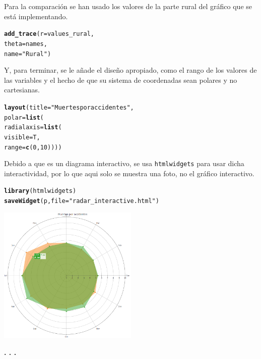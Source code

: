 \documentclass{article}\usepackage[]{graphicx}\usepackage[]{color}
\makeatletter
\newcommand{\hlnum}[1]{\textcolor[rgb]{0.686,0.059,0.569}{#1}}%
\newcommand{\hlstr}[1]{\textcolor[rgb]{0.192,0.494,0.8}{#1}}%
\newcommand{\hlstd}[1]{\textcolor[rgb]{0.345,0.345,0.345}{#1}}%
\newcommand{\hlkwc}[1]{\textcolor[rgb]{0.333,0.667,0.333}{#1}}%
\newcommand{\hlkwd}[1]{\textcolor[rgb]{0.737,0.353,0.396}{\textbf{#1}}}%
\newenvironment{kframe}{%
 \def\at@end@of@kframe{}%
 \ifinner\ifhmode%
  \def\at@end@of@kframe{\end{minipage}}%
  \begin{minipage}{\columnwidth}%
 \fi\fi%
 \def\FrameCommand##1{\hskip\@totalleftmargin \hskip-\fboxsep
 \colorbox{shadecolor}{##1}\hskip-\fboxsep
     \hskip-\linewidth \hskip-\@totalleftmargin \hskip\columnwidth}%
 \MakeFramed {\advance\hsize-\width
   \@totalleftmargin\z@ \linewidth\hsize
   \@setminipage}}%
 {\par\unskip\endMakeFramed%
 \at@end@of@kframe}
\newenvironment{knitrout}{}{} %
\makeatother
\begin{document}
Para la comparaci\'on se han usado los valores de la parte rural del gr\'afico que se est\'a implementando.
\begin{knitrout}
\color{fgcolor}\begin{kframe}
\begin{alltt}
  \hlkwd{add_trace}(r = values_rural,
           theta = names,
           name = \hlstr{"Rural"}) %
\end{alltt}
\end{kframe}
\end{knitrout}
Y, para terminar, se le a\~nade el dise\~no apropiado, como el rango de los valores de las variables y el hecho de que su sistema de coordenadas sean polares y no cartesianas.
\begin{knitrout}
\color{fgcolor}\begin{kframe}
\begin{alltt}
  \hlkwd{layout}\hlstd{(} \hlkwc{title}\hlstd{=} \hlstr{"Muertes por accidentes"}\hlstd{,}
    \hlkwc{polar} \hlstd{=} \hlkwd{list}\hlstd{(}
    \hlkwc{radialaxis} \hlstd{=} \hlkwd{list}\hlstd{(}
      \hlkwc{visible} \hlstd{= T,}
      \hlkwc{range} \hlstd{=} \hlkwd{c}\hlstd{(}\hlnum{0}\hlstd{,} \hlnum{10}\hlstd{))))}
\end{alltt}
\end{kframe}
\end{knitrout}

Debido a que es un diagrama interactivo, se usa \texttt{htmlwidgets} \cite{docu_htmlwidget}
para usar dicha interactividad, por lo que aqui solo se muestra una foto, no el gr\'afico interactivo.
\begin{knitrout}
\color{fgcolor}\begin{kframe}
\begin{alltt}
\hlkwd{library}\hlstd{(htmlwidgets)}
\hlkwd{saveWidget}\hlstd{(p,} \hlkwc{file}\hlstd{=}\hlstr{"radar_interactive.html"}\hlstd{)}
\end{alltt}
\end{kframe}
\end{knitrout}
\vbox{
    \centering
    \includegraphics[width=0.5\textwidth]{imag/radar_interactive}
}
\begin{center}
\textbf{. . .}
\end{center}
\end{document}
